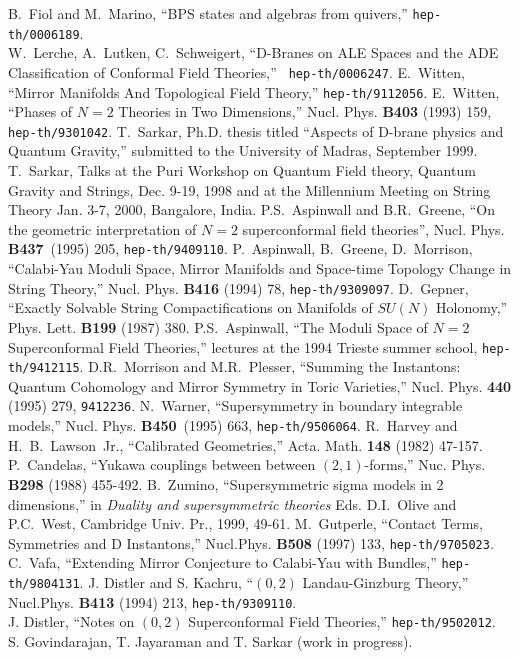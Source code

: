 \documentclass[a4paper,12pt]{article}
\begin{document}
\begin{thebibliography}{99}
B.~Fiol and M.~Marino, ``BPS states and algebras from quivers,''
{\tt hep-th/0006189}. \\
W.~Lerche, A.~Lutken, C.~Schweigert, ``D-Branes on ALE Spaces and the
ADE Classification of Conformal Field Theories,'' {\tt
hep-th/0006247}. 
 E.~Witten, ``Mirror Manifolds And Topological Field
Theory,'' {\tt hep-th/9112056}.
E.~Witten, ``Phases of $N=2$ Theories in Two Dimensions,''
Nucl. Phys. {\bf B403} (1993) 159, {\tt hep-th/9301042}.
 T.~Sarkar, Ph.D. thesis titled ``Aspects of D-brane
physics and Quantum Gravity,'' submitted to the University
of Madras, September 1999.
 T.~Sarkar, Talks  at the Puri Workshop on Quantum Field
theory, Quantum Gravity and Strings, Dec. 9-19, 1998 and at the
Millennium Meeting on String Theory Jan. 3-7, 2000, Bangalore, India.
P.S.~Aspinwall and B.R.~Greene, ``On the geometric interpretation
of $N=2$ superconformal field theories'', Nucl. Phys. {\bf B437}\
(1995) 205, {\tt hep-th/9409110}.
P.~Aspinwall, B.~Greene, D.~Morrison, 
``Calabi-Yau Moduli Space, Mirror Manifolds and Space-time Topology
Change in String Theory,'' 
Nucl. Phys. {\bf B416} (1994) 78, {\tt hep-th/9309097}.
D.~Gepner, ``Exactly Solvable String Compactifications on
Manifolds of $SU(N)$ Holonomy,'' Phys. Lett. {\bf B199}
(1987) 380.
P.S.~Aspinwall, ``The Moduli Space of $N=2$ Superconformal
Field Theories,'' lectures at the 1994 Trieste summer school,
{\tt hep-th/9412115}.
D.R.~Morrison and M.R.~Plesser, ``Summing the Instantons:
Quantum Cohomology and Mirror Symmetry in Toric
Varieties,'' Nucl. Phys. {\bf 440} (1995) 279,
{\tt 9412236}.
N.~Warner, ``Supersymmetry in boundary integrable models,''
Nucl. Phys. {\bf B450}\ (1995) 663, {\tt hep-th/9506064}.
 R.~Harvey and H.~B.~Lawson~Jr., ``Calibrated
Geometries,'' Acta. Math. {\bf 148} (1982) 47-157.
 P.~Candelas, ``Yukawa couplings between between
$(2,1)$-forms,'' Nuc. Phys. {\bf B298} (1988) 455-492.
B.~Zumino, ``Supersymmetric sigma models in 2 dimensions,''
in {\it Duality and supersymmetric theories}
Eds. D.I.~Olive and P.C.~West,  Cambridge Univ. Pr., 1999, 49-61.
\bibitem{gut}
M.~Gutperle, ``Contact Terms, Symmetries and D Instantons,'' 
Nucl.Phys. {\bf B508} (1997) 133, {\tt hep-th/9705023}.
 C.~Vafa, ``Extending Mirror Conjecture to
Calabi-Yau with Bundles,'' {\tt hep-th/9804131}. 
 J. Distler and S. Kachru,  ``$(0,2)$ Landau-Ginzburg
Theory,'' Nucl.Phys. {\bf B413} (1994) 213, {\tt hep-th/9309110}.\\
J. Distler, ``Notes on $(0,2)$ Superconformal Field Theories,''
{\tt hep-th/9502012}.
 S. Govindarajan, T. Jayaraman and T. Sarkar (work in
progress).
\end{thebibliography}
\end{document}
